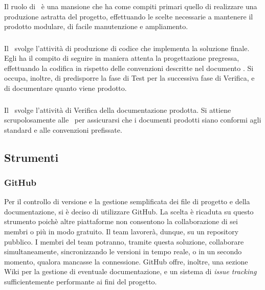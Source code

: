 		\subsubsection{\Prog}
		Il ruolo di \Prog\ è una mansione che ha come compiti primari quello di realizzare una produzione astratta del progetto, effettuando le scelte necessarie a mantenere il prodotto modulare, di facile manutenzione e ampliamento.
		
		\subsubsection{\Progr}
		Il \Progr\ svolge l'attività di produzione di codice che implementa la soluzione finale. Egli ha il compito di seguire in maniera attenta la progettazione pregressa, effettuando la codifica in rispetto delle convenzioni descritte nel documento \NdP. Si occupa, inoltre, di predisporre la fase di Test per la successiva fase di Verifica, e di documentare quanto viene prodotto.
		
		\subsubsection{\Ver}
		Il \Ver\ svolge l'attività di Verifica della documentazione prodotta. Si attiene scrupolosamente alle \NdP\ per assicurarsi che i documenti prodotti siano conformi agli standard e alle convenzioni prefissate.

	\subsection{Strumenti}

		\subsubsection{GitHub}
		Per il controllo di versione e la gestione semplificata dei file di progetto e della documentazione, si è deciso di utilizzare GitHub. La scelta è ricaduta su questo strumento poichè altre piattaforme non consentono la collaborazione di sei membri o più in modo gratuito. Il team lavorerà, dunque, su un repository pubblico. I membri del team potranno, tramite questa soluzione, collaborare simultaneamente, sincronizzando le versioni in tempo reale, o in un secondo momento, qualora mancasse la connessione. GitHub offre, inoltre, una sezione Wiki per la gestione di eventuale documentazione, e un sistema di \textit{issue tracking} sufficientemente performante ai fini del progetto.

